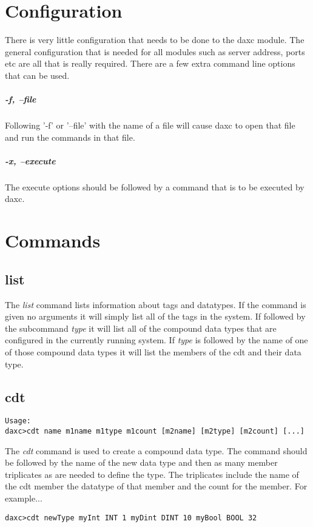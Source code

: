 \documentclass[10pt,letterpaper]{report}
\begin{document}
\section{Configuration}
There is very little configuration that needs to be done to the daxc module.  The general configuration that is needed for all modules such as server address, ports etc are all that is really required.  There are a few extra command line options that can be used.

\subparagraph*{-f, --file}
Following '-f' or '--file' with the name of a file will cause daxc to open that file and run the commands in that file.

\subparagraph*{-x, --execute}
The execute options should be followed by a command that is to be executed by daxc.

\section{Commands}

\subsection{list}
The \textit{list} command lists information about tags and datatypes.  If the command is given no arguments it will simply list all of the tags in the system.  If followed by the subcommand \textit{type} it will list all of the compound data types that are configured in the currently running system.  If \textit{type} is followed by the name of one of those compound data types it will list the members of the cdt and their data type.

\subsection{cdt}
\begin{verbatim}
Usage:
daxc>cdt name m1name m1type m1count [m2name] [m2type] [m2count] [...]
\end{verbatim}
The \textit{cdt} command is used to create a compound data type.  The command should be followed by the name of the new data type and then as many member triplicates as are needed to define the type.  The triplicates include the name of the cdt member the datatype of that member and the count for the member.  For example...

\begin{verbatim}
daxc>cdt newType myInt INT 1 myDint DINT 10 myBool BOOL 32
\end{verbatim}
\end{document}
